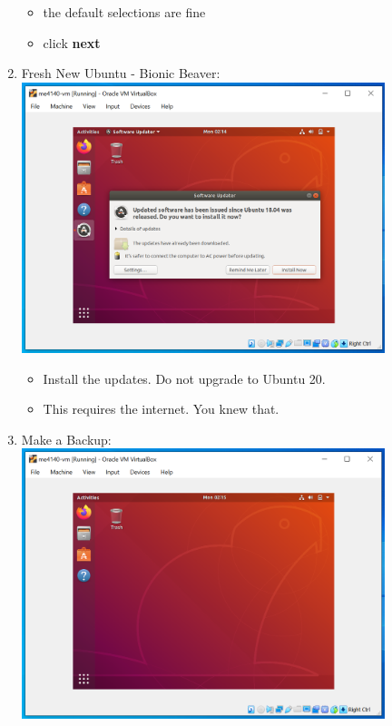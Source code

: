 \documentclass[12pt]{article}
\begin{document}
\begin{description}
\begin{description}
\begin{enumerate}[label=\alph*)]
      		 \begin{itemize}      	
     		\item the default selections are fine
     		\item click {\bf next}
    		\end{itemize}
    		
    		\newpage
    		\item Fresh New Ubuntu - Bionic Beaver: \vspace{5mm} \\
      		\includegraphics[scale=.55]{Capture25.png}
      		 \begin{itemize}
        	\item Install the updates. Do not upgrade to Ubuntu 20.
        	\item This requires the internet. You knew that. 
    		\end{itemize} 
    		 \vspace{5mm} 
    		\item Make a Backup: \vspace{5mm} \\
      		\includegraphics[scale=.55]{Capture26.png}

\end{enumerate}
\end{description}
\end{description}
\end{document}
